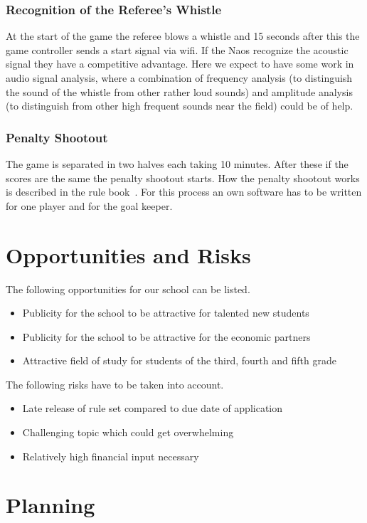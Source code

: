 \documentclass[12pt]{article}
\theoremstyle{definition}
\begin{document}
\subsubsection{Recognition of the Referee's Whistle}
At the start of the game the referee blows a whistle and 15 seconds after this the game controller sends a start signal via wifi. If the Naos recognize the acoustic signal they have a competitive advantage. Here we expect to have some work in audio signal analysis, where a combination of frequency analysis (to distinguish the sound of the whistle from other rather loud sounds) and amplitude analysis (to distinguish from other high frequent sounds near the field) could be of help.

\subsubsection{Penalty Shootout}
The game is separated in two halves each taking 10 minutes. After these if the scores are the same the penalty shootout starts. How the penalty shootout works is described in the rule book~\cite{robocup_technical_committee_robocup_2016}. For this process an own software has to be written for one player and for the goal keeper. 


\section{Opportunities and Risks}
The following opportunities for our school can be listed.
\begin{itemize}
\item Publicity for the school to be attractive for talented new students
\item Publicity for the school to be attractive for the economic partners
\item Attractive field of study for students of the third, fourth and fifth grade
\end{itemize}
The following risks have to be taken into account.
\begin{itemize}
\item Late release of rule set compared to due date of application
\item Challenging topic which could get overwhelming
\item Relatively high financial input necessary
\end{itemize}

\section{Planning}
\end{document}
